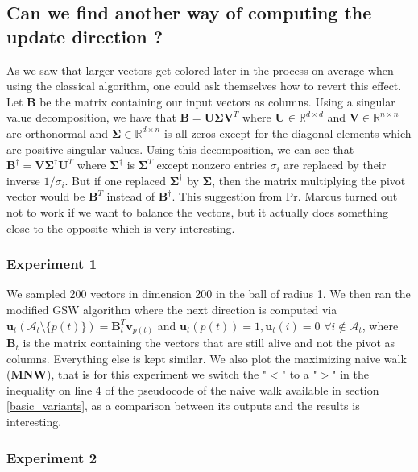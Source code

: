 \documentclass[12pt]{article}
\begin{document}
\subsection{Can we find another way of computing the update direction ?}
 As we saw that larger vectors get colored later in the process on average when using the classical algorithm, one could ask themselves how to revert this effect. Let $\textbf{B}$ be the matrix containing our input vectors as columns. Using a singular value decomposition, we have that $\textbf{B}=\textbf{U}\bm{\Sigma}\textbf{V}^T$ where $\textbf{U}\in\mathbb{R}^{d\times d}$ and $\textbf{V}\in\mathbb{R}^{n\times n}$ are orthonormal and $\bm{\Sigma}\in\mathbb{R}^{d\times n}$ is all zeros except for the diagonal elements which are positive singular values. Using this decomposition, we can see that $\textbf{B}^\dagger=\textbf{V}\bm{\Sigma}^\dagger\textbf{U}^T$ where $\bm{\Sigma}^\dagger$ is $\bm{\Sigma}^T$ except nonzero entries $\sigma_i$ are replaced by their inverse $1/\sigma_i$. But if one replaced $\bm{\Sigma}^\dagger$ by $\bm{\Sigma}$, then the matrix multiplying the pivot vector would be $\textbf{B}^T$ instead of $\textbf{B}^\dagger$. This suggestion from Pr. Marcus turned out not to work if we want to balance the vectors, but it actually does something close to the opposite which is very interesting. 

\subsubsection{Experiment 1}\label{exp1_A_T}

We sampled 200 vectors in dimension 200 in the ball of radius 1. We then ran the modified GSW algorithm where the next direction is computed via $\textbf{u}_t(\mathcal{A}_t\setminus\{p(t)\})=\textbf{B}_t^T\textbf{v}_{p(t)}$ and $\textbf{u}_t(p(t))=1, \textbf{u}_t(i)=0$ $\forall i\not\in\mathcal{A}_t$, where $\textbf{B}_t$ is the matrix containing the vectors that are still alive and not the pivot as columns. Everything else is kept similar. We also plot the maximizing naive walk (\textbf{MNW}), that is for this experiment we switch the "$<$" to a "$>$" in the inequality on line 4 of the pseudocode of the naive walk available in section \ref{basic_variants}, as a comparison between its outputs and the results is interesting.

\subsubsection{Experiment 2}\label{exp2_A_T}
\end{document}
